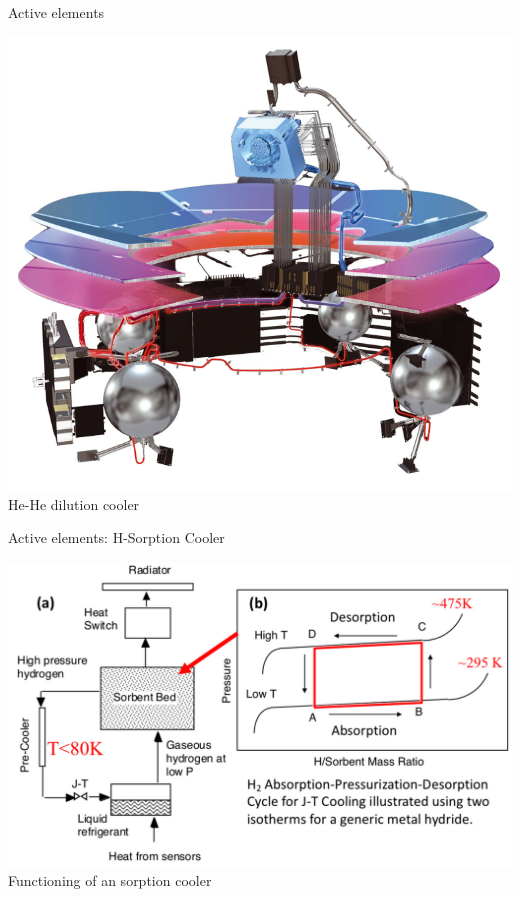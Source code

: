 \begin{frame}{Active elements}
\begin{minipage}{0.3\textwidth}
    \includegraphics[width=0.9\linewidth]{Figures/He_He_dilution.png} 
    \small \centering  He-He dilution cooler
\end{minipage}
\end{frame}




\begin{frame}{Active elements: H-Sorption Cooler}
\centering

    \includegraphics[width=0.7\linewidth]{Figures/Hsorption_cooler_diag.png} \\
    Functioning of an sorption cooler
\end{frame}




